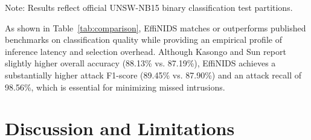 \documentclass[conference]{IEEEtran}
\begin{document}
\begin{table}[htbp]
\caption{Comparison with Published Studies on the UNSW-NB15 Benchmark}
\begin{center}
\end{center}
\vspace{-2mm}
\parbox{\columnwidth}{\footnotesize Note: Results reflect official UNSW-NB15 binary classification test partitions.}
\label{tab:comparison}
\end{table}

As shown in Table~\ref{tab:comparison}, EffiNIDS matches or outperforms published benchmarks on classification quality while providing an empirical profile of inference latency and selection overhead. Although Kasongo and Sun \cite{kasongo2020performance} report slightly higher overall accuracy (88.13\% vs. 87.19\%), EffiNIDS achieves a substantially higher attack F1-score (89.45\% vs. 87.90\%) and an attack recall of 98.56\%, which is essential for minimizing missed intrusions.

\section{Discussion and Limitations}
\end{document}
